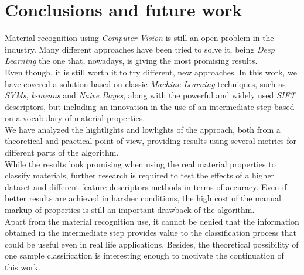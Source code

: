 
\section{Conclusions and future work} \label{sec:conclusions}

Material recognition using \emph{Computer Vision} is still an open problem in the industry. Many different approaches have been tried to solve it, being \emph{Deep Learning} the one that, nowadays, is giving the most promising results. \\

Even though, it is still worth it to try different, new approaches. In this work, we have covered a solution based on classic \emph{Machine Learning} techniques, such as \emph{SVMs}, \emph{k-means} and \emph{Naive Bayes}, along with the powerful and widely used \emph{SIFT} descriptors, but including an innovation in the use of an intermediate step based on a vocabulary of material properties. \\

We have analyzed the hightlights and lowlights of the approach, both from a theoretical and practical point of view, providing results using several metrics for different parts of the algorithm. \\

While the results look promising when using the real material properties to classify materials, further research is required to test the effects of a higher dataset and different feature descriptors methods in terms of accuracy. Even if better results are achieved in harsher conditions, the high cost of the manual markup of properties is still an important drawback of the algorithm. \\

Apart from the material recognition use, it cannot be denied that the information obtained in the intermediate step provides value to the classification process that could be useful even in real life applications. Besides, the theoretical possibility of one sample classification is interesting enough to motivate the continuation of this work.